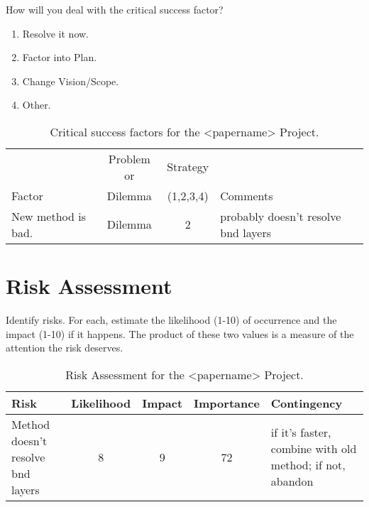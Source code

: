 \documentclass[11pt]{nmemo}
\begin{document}
How will you deal with the critical success factor?
\begin{enumerate}
  \item Resolve it now.
  \item Factor into Plan.
  \item Change Vision/Scope.
  \item Other.
\end{enumerate}

\begin{table}[ht]
  \begin{center}
    \caption{Critical success factors for the <papername> Project.}
    \label{tab:critical-success}
    \begin{tabular}{|p{4.5cm}|c|c|p{4.5cm}|} 
    \hline
                       & Problem or & Strategy  &          \\
    Factor             &  Dilemma   & (1,2,3,4) & Comments \\ 
    \hline\hline
    New method is bad. &  Dilemma   &    2      & probably doesn't
                                                  resolve bnd layers \\
    \hline
    \end{tabular}
  \end{center}
\end{table}


\newpage
\section*{Risk Assessment}

Identify risks.  For each, estimate the likelihood (1-10) of
occurrence and the impact (1-10) if it happens.  The product of these
two values is a measure of the attention the risk deserves.

\begin{table}[ht]
  \begin{center}
    \caption{Risk Assessment for the <papername> Project.}
    \label{tab:risk}
    \begin{tabular}{|p{4.5cm}|c|c|c|p{4.5cm}|} 
    \hline
    Risk & Likelihood & Impact & Importance & Contingency \\
    \hline\hline
    Method doesn't resolve bnd layers &
    8 & 9 & 72 & 
    if it's faster, combine with old method; if not, abandon \\
    \hline
    \end{tabular}
  \end{center}
\end{table}
\end{document}
